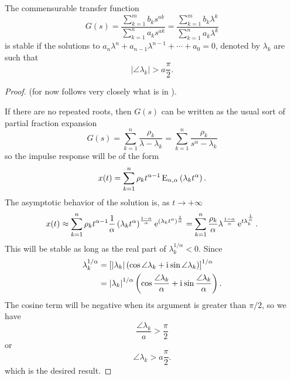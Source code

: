 \begin{theorem}
  The commensurable transfer function
  \begin{equation*}
    G(s) =  \frac{\sum_{k=1}^m b_k s^{a k}}{\sum_{k=1}^n a_k s^{a k}} = 
    \frac{\sum_{k=1}^m b_k \lambda^{k}}{\sum_{k=1}^n a_k \lambda^{k}}
  \end{equation*}
  is stable if the solutions to $a_n \lambda^n + a_{n-1} \lambda^{n-1} + \cdots + a_0 = 0$, denoted by $\lambda_k$ are such that
  \begin{equation*}
    \left| \angle \lambda_k \right| > a \frac{\pi}{2}.
  \end{equation*}
  \label{th:commensurablestability}
\end{theorem}

\begin{proof}
  (for now follows very closely what is in \cite{fraccontrol}).

  If there are no repeated roots, then $G(s)$ can be written as the usual sort of partial fraction expansion
  \begin{equation*}
    G(s) = \sum_{k=1}^n \frac{\rho_k}{\lambda - \lambda_k} =  \sum_{k=1}^n \frac{\rho_k}{s^\alpha - \lambda_k}
  \end{equation*}
  so the impulse response will be of the form
  \begin{equation*}
    x(t) = \sum_{k=1}^n \rho_k t^{\alpha-1} \operatorname{E}_{\alpha,\alpha} \left( \lambda_k t^\alpha \right).
  \end{equation*}
  The asymptotic behavior of the solution is, as $t \rightarrow +\infty$
  \begin{equation*}
    x(t) \approx \sum_{k=1}^n \rho_k t^{\alpha-1} \frac{1}{\alpha} \left( \lambda_k t^\alpha \right)^\frac{1-\alpha}{\alpha} \operatorname{e}^{\left( \lambda_k t^\alpha \right)^\frac{1}{\alpha}} = \sum_{k=1}^n \frac{\rho_k}{\alpha}\lambda^{\frac{1-\alpha}{\alpha}}\operatorname{e}^{t \lambda_k^\frac{1}{\alpha}}.
  \end{equation*}
  This will be stable as long as the real part of $\lambda_k^{1/\alpha} < 0$. Since
  \begin{align*}
    \lambda_k^{1/\alpha} &= \left[ \left| \lambda_k \right| \left( \cos \angle \lambda_k + \mathrm{i}\mkern1mu \sin \angle \lambda_k \right) \right]^{1/\alpha} \\
    &= \left| \lambda_k \right|^{1/\alpha} \left( \cos \frac{\angle \lambda_k}{\alpha} + \mathrm{i}\mkern1mu \sin \frac{\angle \lambda_k}{\alpha} \right).
  \end{align*}
  The cosine term will be negative when its argument is greater than $\pi/2$, so we have
  \begin{equation*}
    \frac{\angle \lambda_k}{a} > \frac{\pi}{2}
  \end{equation*}
  or
  \begin{equation*}
    \angle \lambda_k > a \frac{\pi}{2}.
  \end{equation*}
  which is the desired result.
\end{proof}

